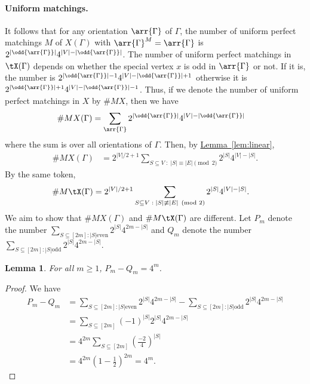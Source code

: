 \documentclass[11pt]{article}
\newcommand{\expref}[2]{\texorpdfstring{\hyperref[#2]{#1~\ref{#2}}}{#1~\ref{#2}}}
\newtheorem{lemma}[theorem]{Lemma}
\begin{document}
\paragraph{Uniform matchings.}
It follows that for any orientation $\arr{\Gamma}$ of $\Gamma$, the number of uniform
perfect matchings $M$ of $X(\Gamma)$ with $\arr{\Gamma}^M = \arr{\Gamma}$ is
$2^{|\odd{\arr{\Gamma}}|}4^{|V|-|\odd{\arr{\Gamma}}|}$. The number of uniform perfect
matchings in $\tX(\Gamma)$ depends on whether the special vertex $x$ is odd in
$\arr{\Gamma}$ or not. If it is, the number is
$2^{|\odd{\arr{\Gamma}}|-1}4^{|V|-|\odd{\arr{\Gamma}}|+1}$ otherwise it is
$2^{|\odd{\arr{\Gamma}}|+1}4^{|V|-|\odd{\arr{\Gamma}}|-1}$. Thus, if we denote the number
of uniform perfect matchings in $X$ by $\# MX$, then we have
$$
\begin{aligned}
  \# M X(\Gamma) & = \sum_{\arr{\Gamma}} 2^{|\odd{\arr{\Gamma}}|}4^{|V|-|\odd{\arr{\Gamma}}|}
\end{aligned}
$$
where the sum is over all orientations of $\Gamma$. Then, by \expref{Lemma}{lem:linear},
$$
\begin{aligned}
  \# M X(\Gamma) & = 2^{|V|/2+1}\sum_{S\subseteq V \; : \; |S| \equiv |E| \pmod 2}
  2^{|S|}4^{|V|-|S|}.
\end{aligned}
$$
By the same token,
$$
\begin{aligned}
  \# M \tX(\Gamma) & = 2^{|V|/2+1}\sum_{S\subseteq V\; : \; |S| \not\equiv |E| \pmod
    2} 2^{|S|}4^{|V|-|S|}.
\end{aligned}
$$
We aim to show that $\# M X(\Gamma)$ and $\# M \tX(\Gamma)$ are different.  Let $P_m$
denote the number $\sum_{S\subseteq [2m] : |S| \text{even}} 2^{|S|}4^{2m-|S|}$
and $Q_m$ denote the number $\sum_{S\subseteq [2m] : |S| \text{odd}}
2^{|S|}4^{2m-|S|}$.
\begin{lemma}\label{lem:pandq}
  For all $m \geq 1$, $P_m - Q_m = 4^m$.
\end{lemma}
\begin{proof}
  We have
  \begin{align*}
    P_m - Q_m & = \sum_{S\subseteq [2m] : |S| \text{even}} 2^{|S|}4^{2m-|S|} - \sum_{S\subseteq [2m] : |S| \text{odd}} 2^{|S|}4^{2m-|S|} \\
              & = \sum_{S \subseteq [2m]} (-1)^{|S|} 2^{|S|}4^{2m-|S|} \\
              & = 4^{2m} \sum_{S \subseteq [2m]}(\frac{-2}{4})^{|S|} \\
    & = 4^{2m}(1-\frac{1}{2})^{2m} = 4^m.
  \end{align*}
  
\end{proof}
\end{document}
